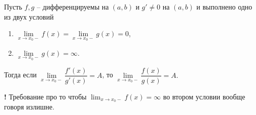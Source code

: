 \begin{theorem}[Лопиталь]\label{Lop}
    Пусть $f,g$ -- дифференцируемы на $(a,b)$ и $g' \ne 0$ на $(a,b)$ и выполнено одно из двух условий
    \begin{enumerate}
        \item $\lim\limits_{x \to x_0-} f(x) = \lim\limits_{x \to x_0 -}g(x) = 0$, 
        \item $\lim\limits_{x \to x_0-}g(x) = \infty.$
    \end{enumerate}

Тогда если $\lim\limits_{x \to x_0-} \dfrac{f'(x)}{g'(x)} = A$, то $\lim\limits_{x \to x_0-} \dfrac{f(x)}{g(x)} = A.$
\end{theorem}

\begin{mydanger}{\bf !}
    Требование про то чтобы $\lim_{x\to x_0-}f(x) = \infty$ во втором условии вообще говоря излишне.
\end{mydanger}

